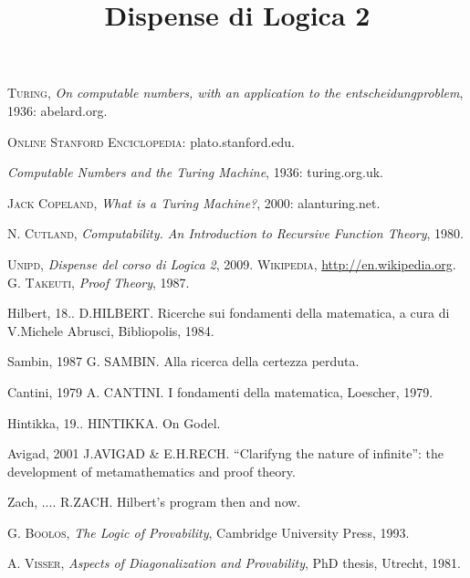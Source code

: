 \documentclass[10pt,a4paper]{amsbook}
\title{Dispense di Logica 2}
\author{}
\date{}
\begin{document}
\maketitle

\tableofcontents












\begin{thebibliography} {}
 \textsc{Turing}, \textsl{On computable numbers, with an
application to the entscheidungproblem}, 1936: abelard.org.

 \textsc{Online Stanford Enciclopedia}: plato.stanford.edu.

 \textsl{Computable Numbers and the Turing Machine}, 1936:
turing.org.uk.

 \textsc{Jack Copeland}, \textsl{What is a Turing Machine?}, 2000:
alanturing.net.

 \textsc{N. Cutland}, \textsl{Computability. An
  Introduction to Recursive Function Theory}, 1980.

 \textsc{Unipd}, \textsl{Dispense del corso di Logica 2},
  2009.
 \textsc{Wikipedia}, \url{http://en.wikipedia.org}.
 \textsc{G. Takeuti}, \textsl{Proof Theory}, 1987.

\bibitem{key-1}{[}Hilbert, 18.. D.HILBERT. Ricerche sui fondamenti
della matematica, a cura di V.Michele Abrusci, Bibliopolis, 1984.

\bibitem{key-4}{[}Sambin, 1987 G. SAMBIN. Alla ricerca della certezza
perduta. 

\bibitem{key-5}{[}Cantini, 1979 A. CANTINI. I fondamenti della matematica,
Loescher, 1979.

\bibitem{key-8}{[}Hintikka, 19.. HINTIKKA. On Godel.

\bibitem{key-1}{[}Avigad, 2001 J.AVIGAD \& E.H.RECH. {}``Clarifyng
the nature of infinite'': the development of metamathematics and
proof theory.

\bibitem{key-1}{[}Zach, .... R.ZACH. Hilbert's program then and now.

 \textsc{G. Boolos}, \textsl{The Logic of Provability}, Cambridge University Press, 1993.

 \textsc{A. Visser}, \textsl{Aspects of Diagonalization and Provability}, PhD thesis, Utrecht, 1981.

\end{thebibliography}
\end{document}
